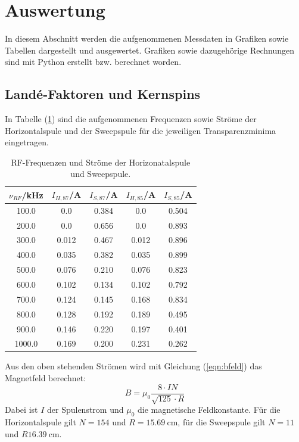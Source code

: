 \newpage
\section{Auswertung}
\label{sec:Auswertung}
In diesem Abschnitt werden die aufgenommenen Messdaten in Grafiken sowie Tabellen dargestellt und ausgewertet. Grafiken sowie dazugehörige Rechnungen sind mit Python \cite{python} erstellt bzw. berechnet worden.
\subsection{Landé-Faktoren und Kernspins}
\label{sec:kernspin}
In Tabelle (\ref{tab:rf}) sind die aufgenommenen Frequenzen sowie Ströme der Horizontalspule und der Sweepspule für die jeweiligen Transparenzminima eingetragen.
\begin{table}
  \centering
  \caption{RF-Frequenzen und Ströme der Horizonatalspule und Sweepspule.}
  \label{tab:rf}
  \begin{tabular}{c | c | c | c | c}
    \toprule
    $\nu_{RF}$/kHz & $I_{H,87}$/A & $I_{S,87}$/A& $I_{H,85}$/A& $I_{S,85}$/A \\
    \midrule
    100.0 & 0.0 & 0.384 & 0.0 & 0.504 \\
    200.0 & 0.0 & 0.656 & 0.0 & 0.893 \\
    300.0 & 0.012 & 0.467 & 0.012 & 0.896 \\
    400.0 & 0.035 & 0.382 & 0.035 & 0.899 \\
    500.0 & 0.076 & 0.210 & 0.076 & 0.823 \\
    600.0 & 0.102 & 0.134 & 0.102 & 0.792 \\
    700.0 & 0.124 & 0.145 & 0.168 & 0.834 \\
    800.0 & 0.128 & 0.192 & 0.189 & 0.495 \\
    900.0 & 0.146 & 0.220 & 0.197 & 0.401 \\
    1000.0 & 0.169 & 0.200 & 0.231 & 0.262 \\
    \bottomrule
  \end{tabular}
\end{table}
\FloatBarrier
Aus den oben stehenden Strömen wird mit Gleichung (\ref{eqn:bfeld}) das Magnetfeld berechnet:
\begin{equation}
  \label{eqn:bfeld}
  B=\mu_\mathrm{0}\dfrac{8\cdot IN}{\sqrt{125}\cdot R}
\end{equation}
Dabei ist $I$ der Spulenstrom und $\mu_\mathrm{0}$ die magnetische Feldkonstante.
Für die Horizontalspule gilt $N=154$ und $R=\SI{15.69}{\centi\meter}$, für die Sweepspule gilt $N=11$ und $R\SI{16.39}{\centi\meter}$.
